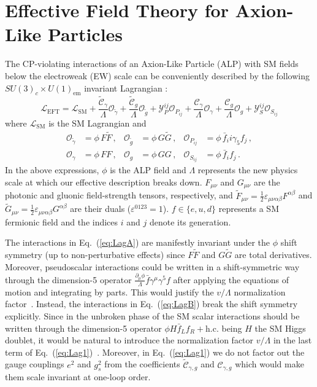 \section{\label{sec:ALPEFT}
Effective Field Theory for Axion-Like Particles
}

The CP-violating interactions of an Axion-Like Particle (ALP) with SM fields below the electroweak (EW) scale can be conveniently described by the following $SU(3)_c \times U(1)_{\text{em}}$ invariant Lagrangian \cite{Marciano:2016yhf,DiLuzio:2020oah}: 
%
\begin{equation}
\label{eq:Lag1}
\mathcal{L}_{\text{EFT}} = \mathcal{L}_{\text{SM}} + 
\frac{\tilde{\mathcal C}_\gamma}{\Lambda} \mathcal{O}_{\tilde\gamma} + \frac{\tilde{\mathcal C}_g}{\Lambda} \mathcal{O}_{\tilde g} + \mathcal{Y}^{ij}_P \mathcal{O}_{P_{ij}} 
+\frac{\mathcal C_\gamma}{\Lambda} \mathcal{O}_\gamma + \frac{\mathcal C_g}{\Lambda} \mathcal{O}_g + \mathcal{Y}^{ij}_S \mathcal{O}_{S_{ij}} 
\end{equation}
%
where $\mathcal{L}_{\text{SM}}$ is the SM Lagrangian and
%
\begin{align}
\label{eq:LagA}
     \mathcal{O}_{\tilde \gamma} &= \phi\, F\tilde F\,, & \mathcal{O}_{\tilde g} &= \phi\, G\tilde G\,, & \mathcal O_{P_{ij}} &= \phi\, \bar{f}_i i \gamma_5 f_j\,,
     \\
\label{eq:LagB}     
 \mathcal O_\gamma &= \phi\, FF\,, & \mathcal O_g &= \phi\, GG\,, & \mathcal O_{S_{ij}} &= \phi\, \bar{f}_i f_j\,.
\end{align}
%
In the above expressions, $\phi$ is the ALP field and $\Lambda$ represents the new physics scale at which our effective description breaks down. $F_{\mu\nu}$ and $G_{\mu\nu}$ are the photonic and gluonic field-strength tensors, respectively, and $\tilde{F}_{\mu\nu} = \frac{1}{2} \varepsilon_{\mu\nu\alpha\beta}F^{\alpha \beta}$ and $\tilde{G}_{\mu\nu} = \frac{1}{2} \varepsilon_{\mu\nu\alpha\beta}G^{\alpha \beta}$ are their duals ($\varepsilon^{0123}=1$). 
$f \in \{ e, u, d \}$ represents a SM fermionic field and the indices $i$ and $j$ denote its generation.

The interactions in Eq.~(\ref{eq:LagA}) are manifestly invariant under the $\phi$ shift symmetry (up to non-perturbative effects) since $F\tilde{F}$ and $G\tilde{G}$ are total derivatives. Moreover, pseudoscalar interactions could be written in a shift-symmetric way through the dimension-5 operator 
$\frac{\partial_\mu \phi}{\Lambda}\bar f \gamma^\mu\gamma^5 f$ after applying the equations of motion and integrating by parts. This would justify the $v/\Lambda$ normalization factor~\cite{DiLuzio:2020wdo}. 
Instead, the interactions in Eq.~(\ref{eq:LagB}) break the shift symmetry explicitly. 
Since in the unbroken phase of the SM scalar interactions should be written through the dimension-5 operator $\phi H \bar f_L f_R + \mathrm{h.c.}$ being $H$ the SM Higgs doublet, it would be natural to introduce the normalization factor $v/\Lambda$ in the last term of Eq.~(\ref{eq:Lag1})~\cite{DiLuzio:2020wdo}. 
Moreover, in Eq.~(\ref{eq:Lag1}) we do not factor out the gauge couplings $e^2$ and $g^2_s$ from the coefficients $\tilde{\mathcal C}_{\gamma,g}$ and $\mathcal C_{\gamma,g}$ which would make them scale invariant at one-loop order. 


